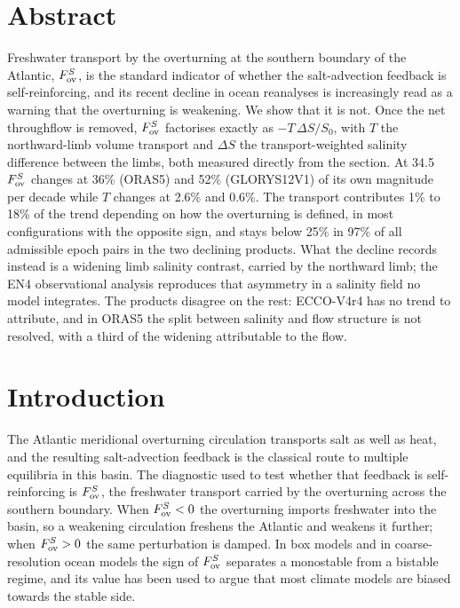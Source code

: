 \section*{Abstract}

Freshwater transport by the overturning at the southern boundary of the
Atlantic, $F_{\mathrm{ov}}^{S}$, is the standard indicator of whether the salt-advection
feedback is self-reinforcing, and its recent decline in ocean reanalyses is
increasingly read as a warning that the overturning is weakening. We show that
it is not. Once the net throughflow is removed, $F_{\mathrm{ov}}^{S}$ factorises exactly as
$-T\,\Delta S/S_0$, with $T$ the northward-limb volume transport and $\Delta S$
the transport-weighted salinity difference between the limbs, both measured
directly from the section. At 34.5\degS{} $F_{\mathrm{ov}}^{S}$ changes at 36\% (ORAS5) and
52\% (GLORYS12V1) of its own magnitude per decade while $T$ changes at 2.6\%
and 0.6\%. The transport contributes 1\% to 18\% of the trend depending on how
the overturning is defined, in most configurations with the opposite sign, and
stays below 25\% in 97\% of all admissible epoch pairs in the two declining
products. What the decline
records instead is a widening limb salinity contrast, carried by the northward
limb; the EN4 observational analysis reproduces that asymmetry in a salinity field no
model integrates. The products disagree on the rest: ECCO-V4r4 has no trend to
attribute, and in ORAS5 the split between salinity and flow structure is not
resolved, with a third of the widening attributable to the flow.

\section*{Introduction}

The Atlantic meridional overturning circulation transports salt as well as
heat, and the resulting salt-advection feedback is the classical route to
multiple equilibria in this basin\cite{Stommel1961,Rahmstorf1996,Rahmstorf2002}.
The diagnostic used to test whether that feedback is self-reinforcing is
$F_{\mathrm{ov}}^{S}$, the freshwater transport carried by the overturning across the
southern boundary\cite{deVries2005,Huisman2010,Dijkstra2007}. When $F_{\mathrm{ov}}^{S}<0$
the overturning imports freshwater into the basin, so a weakening circulation
freshens the Atlantic and weakens it further; when $F_{\mathrm{ov}}^{S}>0$ the same
perturbation is damped. In box models and in coarse-resolution ocean models the
sign of $F_{\mathrm{ov}}^{S}$ separates a monostable from a bistable regime, and its value has
been used to argue that most climate models are biased towards the stable
side\cite{Weijer2019,Mecking2017,vanWestenDijkstra2024}.

